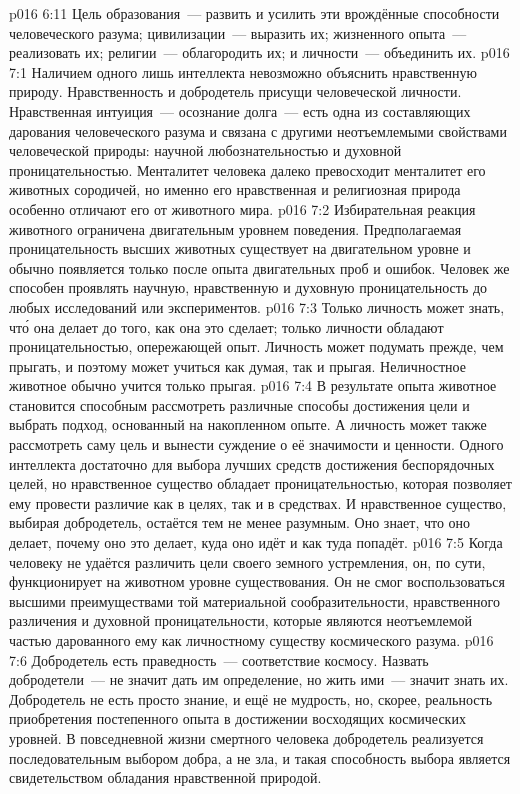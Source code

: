\vs p016 6:11 Цель образования~--- развить и усилить эти врождённые способности человеческого разума; цивилизации~--- выразить их; жизненного опыта~--- реализовать их; религии~--- облагородить их; и личности~--- объединить их.
\vs p016 7:1 Наличием одного лишь интеллекта невозможно объяснить нравственную природу. Нравственность и добродетель присущи человеческой личности. Нравственная интуиция~--- осознание долга~--- есть одна из составляющих дарования человеческого разума и связана с другими неотъемлемыми свойствами человеческой природы: научной любознательностью и духовной проницательностью. Менталитет человека далеко превосходит менталитет его животных сородичей, но именно его нравственная и религиозная природа особенно отличают его от животного мира.
\vs p016 7:2 Избирательная реакция животного ограничена двигательным уровнем поведения. Предполагаемая проницательность высших животных существует на двигательном уровне и обычно появляется только после опыта двигательных проб и ошибок. Человек же способен проявлять научную, нравственную и духовную проницательность до любых исследований или экспериментов.
\vs p016 7:3 Только личность может знать, чт\'о она делает до того, как она это сделает; только личности обладают проницательностью, опережающей опыт. Личность может подумать прежде, чем прыгать, и поэтому может учиться как думая, так и прыгая. Неличностное животное обычно учится только прыгая.
\vs p016 7:4 В результате опыта животное становится способным рассмотреть различные способы достижения цели и выбрать подход, основанный на накопленном опыте. А личность может также рассмотреть саму цель и вынести суждение о её значимости и ценности. Одного интеллекта достаточно для выбора лучших средств достижения беспорядочных целей, но нравственное существо обладает проницательностью, которая позволяет ему провести различие как в целях, так и в средствах. И нравственное существо, выбирая добродетель, остаётся тем не менее разумным. Оно знает, что оно делает, почему оно это делает, куда оно идёт и как туда попадёт.
\vs p016 7:5 Когда человеку не удаётся различить цели своего земного устремления, он, по сути, функционирует на животном уровне существования. Он не смог воспользоваться высшими преимуществами той материальной сообразительности, нравственного различения и духовной проницательности, которые являются неотъемлемой частью дарованного ему как личностному существу космического разума.
\vs p016 7:6 \pc Добродетель есть праведность~--- соответствие космосу. Назвать добродетели~--- не значит дать им определение, но жить ими~--- значит знать их. Добродетель не есть просто знание, и ещё не мудрость, но, скорее, реальность приобретения постепенного опыта в достижении восходящих космических уровней. В повседневной жизни смертного человека добродетель реализуется последовательным выбором добра, а не зла, и такая способность выбора является свидетельством обладания нравственной природой.
